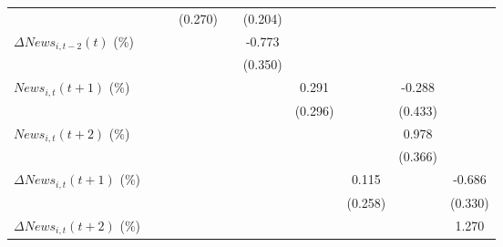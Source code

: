 {\begin{tabular}{l*{9}{c}}
                    &                     &                     &     (0.270)         &                     &     (0.204)         &                     &                     &                     &                     \\
\addlinespace
$ \Delta News_{i,t-2}(t)$ (\%)&                     &                     &                     &                     &      -0.773\sym{*}  &                     &                     &                     &                     \\
                    &                     &                     &                     &                     &     (0.350)         &                     &                     &                     &                     \\
\addlinespace
$ News_{i,t}(t+1)$ (\%)&                     &                     &                     &                     &                     &       0.291         &                     &      -0.288         &                     \\
                    &                     &                     &                     &                     &                     &     (0.296)         &                     &     (0.433)         &                     \\
\addlinespace
$ News_{i,t}(t+2)$ (\%)&                     &                     &                     &                     &                     &                     &                     &       0.978\sym{**} &                     \\
                    &                     &                     &                     &                     &                     &                     &                     &     (0.366)         &                     \\
\addlinespace
$ \Delta News_{i,t}(t+1)$ (\%)&                     &                     &                     &                     &                     &                     &       0.115         &                     &      -0.686\sym{*}  \\
                    &                     &                     &                     &                     &                     &                     &     (0.258)         &                     &     (0.330)         \\
\addlinespace
$ \Delta News_{i,t}(t+2)$ (\%)&                     &                     &                     &                     &                     &                     &                     &                     &       1.270\sym{***}\\

\end{tabular}}
